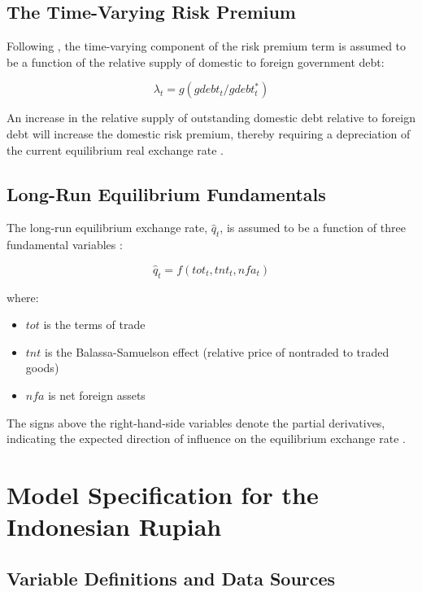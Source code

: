 \documentclass[11pt,a4paper]{article}
\begin{document}
\subsection{The Time-Varying Risk Premium}

Following \cite{ClarkMacDonald1998}, the time-varying component of the risk premium term is assumed to be a function of the relative supply of domestic to foreign government debt:

\begin{equation}
\lambda_t = g(gdebt_t / gdebt_t^*)
\label{eq:risk_premium_function}
\end{equation}

An increase in the relative supply of outstanding domestic debt relative to foreign debt will increase the domestic risk premium, thereby requiring a depreciation of the current equilibrium real exchange rate \citep{ClarkMacDonald1998}.

\subsection{Long-Run Equilibrium Fundamentals}

The long-run equilibrium exchange rate, $\hat{q}_t$, is assumed to be a function of three fundamental variables \citep{ClarkMacDonald1998}:

\begin{equation}
\hat{q}_t = f(tot_t, tnt_t, nfa_t)
\label{eq:long_run_fundamentals}
\end{equation}

where:
\begin{itemize}
    \item $tot$ is the terms of trade
    \item $tnt$ is the Balassa-Samuelson effect (relative price of nontraded to traded goods)
    \item $nfa$ is net foreign assets
\end{itemize}

The signs above the right-hand-side variables denote the partial derivatives, indicating the expected direction of influence on the equilibrium exchange rate \citep{ClarkMacDonald1998}.

\section{Model Specification for the Indonesian Rupiah}

\subsection{Variable Definitions and Data Sources}
\end{document}
